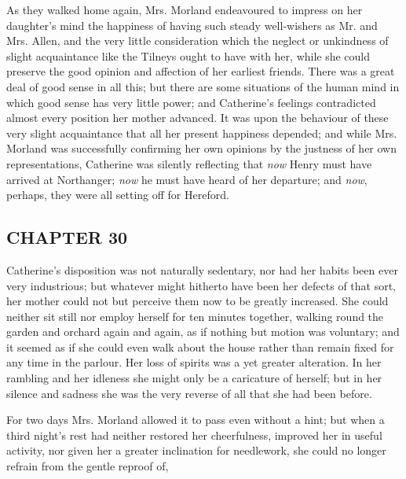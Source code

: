 As they walked home again, Mrs. Morland endeavoured to impress on her daughter's mind the happiness of having such steady well-wishers as Mr. and Mrs. Allen, and the very little consideration which the neglect or unkindness of slight acquaintance like the Tilneys ought to have with her, while she could preserve the good opinion and affection of her earliest friends. There was a great deal of good sense in all this; but there are some situations of the human mind in which good sense has very little power; and Catherine's feelings contradicted almost every position her mother advanced. It was upon the behaviour of these very slight acquaintance that all her present happiness depended; and while Mrs. Morland was successfully confirming her own opinions by the justness of her own representations, Catherine was silently reflecting that {\em now} Henry must have arrived at Northanger; {\em now} he must have heard of her departure; and {\em now}, perhaps, they were all setting off for Hereford.

\subsection[chapter-30]{\useURL[url32][][][]\from[url32]CHAPTER 30}

Catherine's disposition was not naturally sedentary, nor had her habits been ever very industrious; but whatever might hitherto have been her defects of that sort, her mother could not but perceive them now to be greatly increased. She could neither sit still nor employ herself for ten minutes together, walking round the garden and orchard again and again, as if nothing but motion was voluntary; and it seemed as if she could even walk about the house rather than remain fixed for any time in the parlour. Her loss of spirits was a yet greater alteration. In her rambling and her idleness she might only be a caricature of herself; but in her silence and sadness she was the very reverse of all that she had been before.

For two days Mrs. Morland allowed it to pass even without a hint; but when a third night's rest had neither restored her cheerfulness, improved her in useful activity, nor given her a greater inclination for needlework, she could no longer refrain from the gentle reproof of, 

